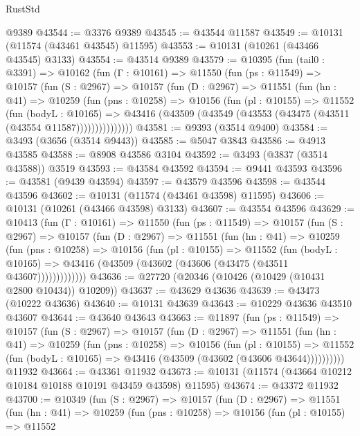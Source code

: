 \begin{lexlean}{RustStd}
\begin{coremodule}
    @9389
@43544 := @3376 @9389
@43545 := @43544 @11587
@43549 := @10131 (@11574 (@43461 @43545) @11595)
@43553 := @10131 (@10261 (@43466 @43545) @3133)
@43554 := @43514 @9389
@43579 := @10395
    (fun (tail0 : @3391) =>
    @10162
      (fun (Γ : @10161) =>
      @11550
        (fun (ps : @11549) =>
        @10157
          (fun (S : @2967) =>
          @10157
            (fun (D : @2967) =>
            @11551
              (fun (hn : @41) =>
              @10259
                (fun (pns : @10258) =>
                @10156
                  (fun (pl : @10155) =>
                  @11552
                    (fun (bodyL : @10165) =>
                    @43416 (@43509 (@43549 (@43553 (@43475 (@43511 (@43554 @11587)))))))))))))))
@43581 := @9393 (@3514 @9400)
@43584 := @3493 (@3656 (@3514 @9443))
@43585 := @5047 @3843
@43586 := @4913 @43585
@43588 := @8908 @43586 @3104
@43592 := @3493 (@3837 (@3514 @43588)) @3519
@43593 := @43584 @43592
@43594 := @9441 @43593
@43596 := @43581 (@9439 @43594)
@43597 := @43579 @43596
@43598 := @43544 @43596
@43602 := @10131 (@11574 (@43461 @43598) @11595)
@43606 := @10131 (@10261 (@43466 @43598) @3133)
@43607 := @43554 @43596
@43629 := @10413
    (fun (Γ : @10161) =>
    @11550
      (fun (ps : @11549) =>
      @10157
        (fun (S : @2967) =>
        @10157
          (fun (D : @2967) =>
          @11551
            (fun (hn : @41) =>
            @10259
              (fun (pns : @10258) =>
              @10156
                (fun (pl : @10155) =>
                @11552
                  (fun (bodyL : @10165) =>
                  @43416 (@43509 (@43602 (@43606 (@43475 (@43511 @43607)))))))))))))
@43636 := @27720 (@20346 (@10426 (@10429 (@10431 @2800 @10434)) @10209))
@43637 := @43629 @43636
@43639 := @43473 (@10222 @43636)
@43640 := @10131 @43639
@43643 := @10229 @43636 @43510 @43607
@43644 := @43640 @43643
@43663 := @11897
    (fun (ps : @11549) =>
    @10157
      (fun (S : @2967) =>
      @10157
        (fun (D : @2967) =>
        @11551
          (fun (hn : @41) =>
          @10259
            (fun (pns : @10258) =>
            @10156
              (fun (pl : @10155) =>
              @11552 (fun (bodyL : @10165) => @43416 (@43509 (@43602 (@43606 @43644))))))))))
    @11932
@43664 := @43361 @11932
@43673 := @10131 (@11574 (@43664 @10212 @10184 @10188 @10191 @43459 @43598) @11595)
@43674 := @43372 @11932
@43700 := @10349
    (fun (S : @2967) =>
    @10157
      (fun (D : @2967) =>
      @11551
        (fun (hn : @41) =>
        @10259
          (fun (pns : @10258) =>
          @10156
            (fun (pl : @10155) =>
            @11552

\end{coremodule}
\end{lexlean}
